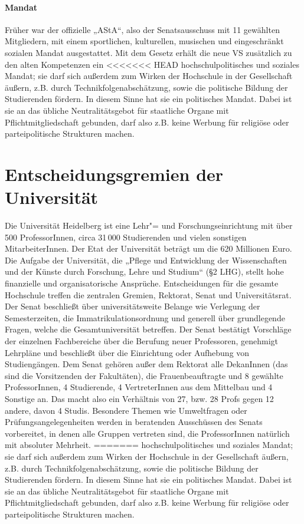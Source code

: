 \paragraph{Mandat}

Früher war der offizielle „AStA“, also der Senatsausschuss mit 11 gewählten
Mitgliedern, mit einem sportlichen, kulturellen, musischen und eingeschränkt
sozialen Mandat ausgestattet.
Mit dem Gesetz erhält die neue VS zusätzlich zu den alten Kompetenzen ein
<<<<<<< HEAD
hochschulpolitisches und soziales Mandat; sie darf sich außerdem zum Wirken der
Hochschule in der Gesellschaft äußern, z.B. durch Technikfolgenabschätzung,
sowie die politische Bildung der Studierenden fördern. In diesem Sinne hat sie
ein politisches Mandat. Dabei ist sie an das übliche Neutralitätsgebot für
staatliche Organe mit Pflichtmitgliedschaft gebunden, darf also z.B. keine
Werbung für religiöse oder parteipolitische Strukturen machen.

\section{Entscheidungsgremien der Universität}

Die Universität Heidelberg ist eine Lehr"= und Forschungseinrichtung mit über
500 ProfessorInnen, circa 31\,000 Studierenden und vielen sonstigen
MitarbeiterInnen. Der Etat der Universität beträgt um die 620 Millionen Euro.
Die Aufgabe der Universität, die „Pflege und Entwicklung der Wissenschaften und
der Künste durch Forschung, Lehre und Studium“ (§2
LHG), stellt hohe finanzielle und organisatorische Ansprüche.  Entscheidungen
für die gesamte Hochschule treffen die zentralen Gremien, Rektorat, Senat und
Universitätsrat. Der Senat beschließt über universitätsweite Belange wie
Verlegung der Semesterzeiten, die Immatrikulationsordnung und generell über
grundlegende Fragen, welche die Gesamtuniversität betreffen. Der Senat
bestätigt Vorschläge der einzelnen Fachbereiche über die Berufung neuer
Professoren, genehmigt Lehrpläne und beschließt über die Einrichtung oder
Aufhebung von Studiengängen. Dem Senat gehören außer dem Rektorat alle
DekanInnen (das sind die Vorsitzenden der Fakultäten), die Frauenbeauftragte
und 8 gewählte ProfessorInnen, 4 Studierende, 4 VertreterInnen aus dem
Mittelbau und 4 Sonstige an. Das macht also ein Verhältnis von 27, bzw. 28
Profs gegen 12 andere, davon 4 Studis. Besondere Themen wie Umweltfragen oder
Prüfungsangelegenheiten werden in beratenden Ausschüssen des Senats
vorbereitet, in denen alle Gruppen vertreten sind, die ProfessorInnen natürlich
mit absoluter Mehrheit.
=======
hochschulpolitisches und soziales Mandat; sie darf sich außerdem zum Wirken
der Hochschule in der Gesellschaft äußern, z.B. durch Technikfolgenabschätzung,
sowie die politische Bildung der Studierenden fördern. In diesem Sinne hat
sie ein politisches Mandat. Dabei ist sie an das übliche Neutralitätsgebot
für staatliche Organe mit Pflichtmitgliedschaft gebunden, darf also z.B.
keine Werbung für religiöse oder parteipolitische Strukturen machen.

